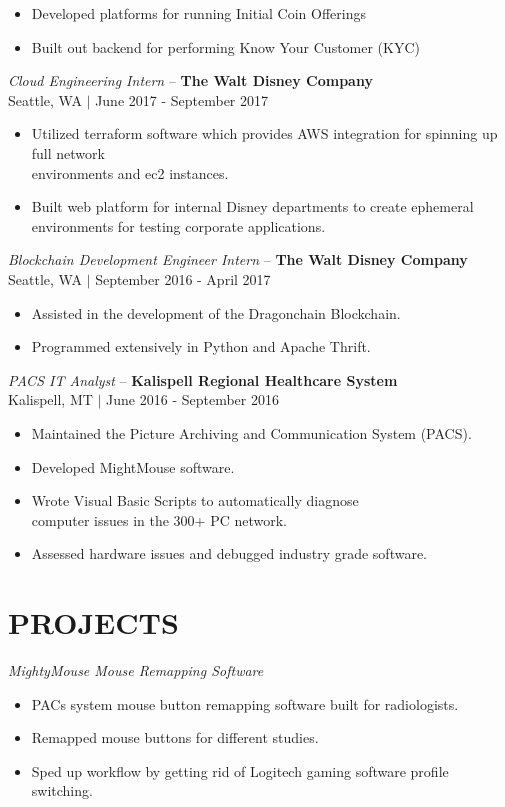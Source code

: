 \documentclass[line,margin]{res}
\begin{document}
\begin{resume}
	\begin{itemize} \itemsep -2pt
		\item Developed platforms for running Initial Coin Offerings
		\item Built out backend for performing Know Your Customer (KYC)
	\end{itemize}
	{\sl Cloud Engineering Intern} -- {\bf The Walt Disney Company}\\ 
	{\footnotesize Seattle, WA $|$ June 2017 - September 2017}
	\begin{itemize} \itemsep -2pt
		\item Utilized terraform software which provides AWS integration for spinning up full network \\environments and ec2 instances.
		\item Built web platform for internal Disney departments to create ephemeral environments for testing corporate applications.
	\end{itemize}
	{\sl Blockchain Development Engineer Intern} -- {\bf The Walt Disney Company}\\ 
	{\footnotesize Seattle, WA $|$ September 2016 - April 2017}
	\begin{itemize} \itemsep -2pt
		\item Assisted in the development of the Dragonchain Blockchain.
		\item Programmed extensively in Python and Apache Thrift.
	\end{itemize}
	{\sl PACS IT Analyst} -- {\bf Kalispell Regional Healthcare System} \\
	{\footnotesize Kalispell, MT $|$ June 2016 - September 2016}
	\begin{itemize} \itemsep -2pt
		\item Maintained the Picture Archiving and Communication System (PACS).
		\item Developed MightMouse software.
		\item Wrote Visual Basic Scripts to automatically diagnose \\computer issues in the 300+ PC network.
		\item Assessed hardware issues and debugged industry grade software.
	\end{itemize}
	\section{PROJECTS}
		{\sl MightyMouse Mouse Remapping Software}
\begin{itemize}\itemsep -2pt
		\item PACs system mouse button remapping software built for radiologists.
		\item Remapped mouse buttons for different studies.
		\item Sped up workflow by getting rid of Logitech gaming software profile switching.
	\end{itemize}




\end{resume}
\end{document}
